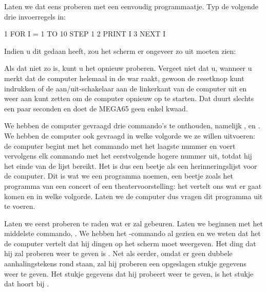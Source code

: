 \needspace{4cm} %
Laten we dat eens proberen met een eenvoudig programmaatje. Typ de volgende drie invoerregels in:

\begin{screencode}
1 FOR I = 1 TO 10 STEP 1
2 PRINT I
3 NEXT I
\end{screencode}

\needspace{4cm} %
Indien u dit gedaan heeft, zou het scherm er ongeveer zo uit moeten zien:


Als dat niet zo is, kunt u het opnieuw proberen. Vergeet niet dat u, wanneer u merkt dat de computer helemaal in de war raakt, gewoon de resetknop kunt indrukken of de aan/uit-schakelaar aan de linkerkant van de computer uit en weer aan kunt zetten om de computer opnieuw op te starten. Dat duurt slechts een paar seconden en doet de MEGA65 geen enkel kwaad.

We hebben de computer gevraagd drie commando's te onthouden, namelijk ,
en . We hebben de computer ook gevraagd in welke volgorde we ze willen uitvoeren: de computer begint met het commando met het laagste nummer en voert vervolgens elk commando met het eerstvolgende hogere nummer uit, totdat hij het einde van de lijst bereikt. Het is dus een beetje als een herinneringslijst voor de computer. Dit is wat we een programma noemen, een beetje zoals het programma van een concert of een theatervoorstelling: het vertelt ons wat er gaat komen en in welke volgorde. Laten we de computer dus vragen dit programma uit te voeren.

Laten we eerst proberen te raden wat er zal gebeuren. Laten we beginnen met het middelste commando, . We hebben het -commando al gezien en we weten dat het de computer vertelt dat hij dingen op het scherm moet weergeven. Het ding dat hij zal proberen weer te geven is . Net als eerder, omdat er geen dubbele aanhalingstekens rond  staan, zal hij proberen een opgeslagen stukje gegevens weer te geven. Het stukje gegevens dat hij probeert weer te geven, is het stukje dat hoort bij .

